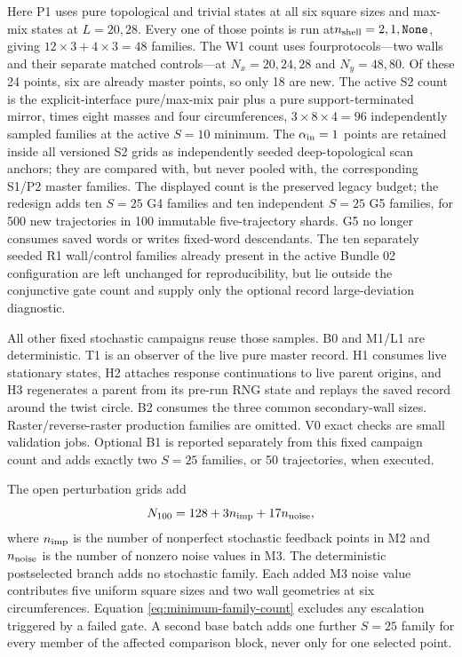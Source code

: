 \documentclass[aps,prx,twocolumn,floatfix,nofootinbib,superscriptaddress,longbibliography]{revtex4-2}
\begin{document}
\begin{sloppypar}
Here P1 uses pure topological and trivial states at all six square sizes and max-mix states
at $L=20,28$.  Every one of those points is run at\linebreak[1]
$n_{\rm shell}=2,1,\texttt{None}$, giving $12\times3+4\times3=48$ families.  The W1 count uses four\linebreak[1]
protocols---two walls\linebreak
and their separate matched controls---at
$N_x=20,24,28$ and $N_y=48,80$.  Of these 24 points, six are already master points, so
only 18 are new.  The active S2 count is the explicit-interface pure/max-mix pair plus a
pure support-terminated mirror, times eight masses and four circumferences,
$3\times8\times4=96$ independently sampled families at the active $S=10$ minimum.  The
$\alpha_{\rm in}=1$ points are retained inside all versioned S2 grids as independently
seeded deep-topological scan anchors; they are compared with, but never pooled with, the
corresponding S1/P2 master families.  The displayed count is the preserved legacy budget;
the redesign adds ten $S=25$ G4 families and ten independent $S=25$ G5 families, for 500
new trajectories in 100 immutable five-trajectory shards.  G5 no longer consumes saved
words or writes fixed-word descendants.
The ten separately seeded R1 wall/control families already present in the active Bundle 02
configuration are left unchanged for reproducibility, but lie outside the conjunctive gate
count and supply only the optional record large-deviation diagnostic.
\end{sloppypar}

All other fixed stochastic campaigns reuse those samples.  B0 and M1/L1 are
deterministic.  T1 is an observer of the live pure master record.  H1 consumes live
stationary states, H2 attaches response continuations to live parent origins,
and H3 regenerates a parent from its pre-run RNG state and replays the saved record around
the twist circle.  B2 consumes the three common
secondary-wall sizes.  Raster/reverse-raster production families are omitted.  V0 exact
checks are small validation jobs.  Optional B1 is reported separately from this fixed
campaign count and adds exactly two $S=25$ families, or 50 trajectories, when executed.

The open perturbation grids add
\begin{equation}
 N_{100}=128+3n_{\rm imp}+17n_{\rm noise},
 \label{eq:minimum-family-count}
\end{equation}
where $n_{\rm imp}$ is the number of nonperfect stochastic feedback points in M2 and
$n_{\rm noise}$ is the number of nonzero noise values in M3.  The deterministic
postselected branch adds no stochastic family.  Each added M3 noise value contributes five
uniform square sizes and two wall geometries at six circumferences.  Equation
\eqref{eq:minimum-family-count} excludes any escalation triggered by a failed gate.  A
second base batch adds one further $S=25$ family for every member of the affected
comparison block, never only for one selected point.
\end{document}
